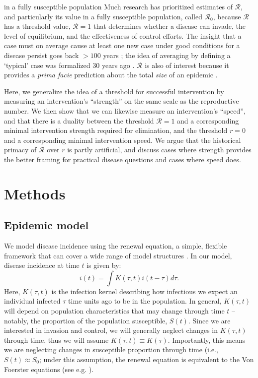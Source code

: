 \documentclass[12pt]{article}
\newcommand{\Rx}[1]{\ensuremath{{\mathcal R}_{#1}}}
\newcommand{\Ro}{\Rx{0}}
\newcommand{\RR}{\ensuremath{{\mathcal R}}}
\begin{document}
 in a fully susceptible population \citep{anderson1991infectious, diekmann1990definition}
Much research has prioritized estimates of \RR, and particularly its value in a fully susceptible population, called \Ro, because \RR has a threshold value, $\RR=1$ that determines whether a disease can invade, the level of equilibrium, and the effectiveness of control efforts.
The insight that a case must on average cause at least one new case under good conditions for a disease persist goes back $>100$ years \citep{ross1911prevention};
the idea of averaging by defining a `typical' case was formalized 30 years ago \citep{diekmann1990definition}.
$\RR$ is also of interest because it provides a \emph{prima facie} prediction about the total \emph{size} of an epidemic \citep{anderson1991infectious, ma2006generality, arino2007final, andreasen2011final, miller2012note}.

Here, we generalize the idea of a threshold for successful intervention by measuring an intervention's ``strength'' on the same scale as the reproductive number. 
We then show that we can likewise measure an intervention's ``speed'', and that there is a duality between the threshold $\RR=1$ and a corresponding minimal intervention strength required for elimination, and the threshold $r=0$ and a corresponding minimal intervention speed. 
We argue that the historical primacy of $\RR$ over $r$ is partly artificial, and discuss cases where strength provides the better framing for practical disease questions and cases where speed does.

\section{Methods}

\subsection{Epidemic model}

We model disease incidence using the renewal equation, a simple, flexible framework that can cover a wide range of model structures \citep{heesterbeek1996concept, diekmann2000mathematical, roberts2004modelling, aldis2005integral, wallinga2007generation, roberts2007model, Champredon2018equivalence}.
In our model, disease incidence at time $t$ is given by:
\begin{equation}
i(t) = \int K(\tau, t) i(t-\tau) d\tau.
\end{equation}
Here, $K(\tau, t)$ is the infection kernel describing how infectious we expect an individual infected $\tau$ time units ago to be in the population.
In general, $K(\tau, t)$ will depend on population characteristics that may change through time $t$ -- notably, the proportion of the population susceptible, $S(t)$.
Since we are interested in invasion and control, we will generally neglect changes in $K(\tau, t)$ through time, thus we will assume $K(\tau, t) \equiv K(\tau)$.
Importantly, this means we are neglecting changes in susceptible proportion through time (i.e., $S(t) \approx S_0$;
under this assumption, the renewal equation is equivalent to the Von Foerster equations (see e.g. \cite{fraser2004factors}).
\end{document}
